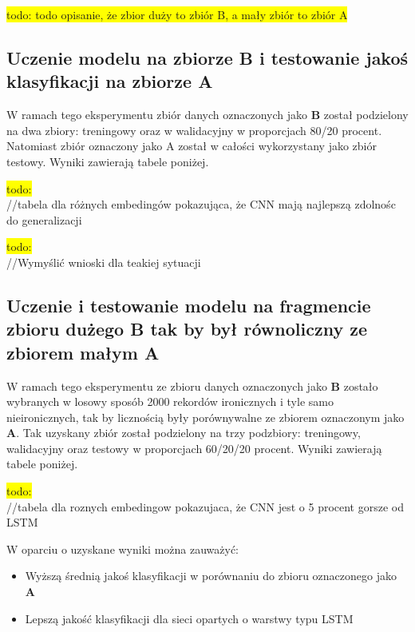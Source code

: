 \colorbox{yellow}{todo: todo opisanie, że zbior duży to zbiór B, a mały zbiór to zbiór A}\\
\subsection{Uczenie modelu na zbiorze B i testowanie jakoś klasyfikacji na zbiorze A }

W ramach tego eksperymentu zbiór danych oznaczonych jako \textbf{B} został podzielony na dwa zbiory: treningowy oraz w walidacyjny w proporcjach 80/20 procent. Natomiast zbiór oznaczony jako A został w całości wykorzystany jako zbiór testowy. Wyniki zawierają tabele poniżej.

\colorbox{yellow}{todo:}\\
//tabela dla różnych embedingów pokazująca, że CNN mają najlepszą zdolnośc do generalizacji

\colorbox{yellow}{todo:}\\
//Wymyślić wnioski dla teakiej sytuacji


\subsection{Uczenie i testowanie modelu na fragmencie zbioru dużego B tak by był równoliczny ze zbiorem małym A}

W ramach tego eksperymentu ze zbioru danych oznaczonych jako \textbf{B} zostało wybranych w losowy sposób 2000 rekordów ironicznych i tyle samo nieironicznych, tak by licznością były porównywalne ze zbiorem oznaczonym jako \textbf{A}. Tak uzyskany zbiór został podzielony na trzy podzbiory: treningowy, walidacyjny oraz testowy w proporcjach 60/20/20 procent. Wyniki zawierają tabele poniżej.

\colorbox{yellow}{todo:}\\
//tabela dla roznych embedingow pokazujaca, że CNN jest o 5 procent gorsze od LSTM

W oparciu o uzyskane wyniki można zauważyć:

\begin{itemize}
    \item Wyższą średnią jakoś klasyfikacji w porównaniu do zbioru oznaczonego jako \textbf{A}
    \item Lepszą jakość klasyfikacji dla sieci opartych o warstwy typu LSTM
\end{itemize}


